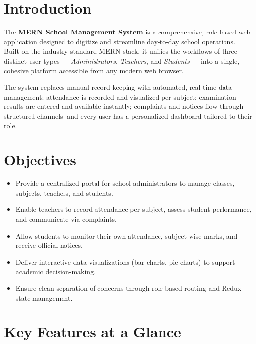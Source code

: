 \documentclass[12pt,a4paper]{report}
\begin{document}
\section{Introduction}

The \textbf{MERN School Management System} is a comprehensive, role-based web application designed to digitize and streamline day-to-day school operations. Built on the industry-standard MERN stack, it unifies the workflows of three distinct user types --- \textit{Administrators}, \textit{Teachers}, and \textit{Students} --- into a single, cohesive platform accessible from any modern web browser.

The system replaces manual record-keeping with automated, real-time data management: attendance is recorded and visualized per-subject; examination results are entered and available instantly; complaints and notices flow through structured channels; and every user has a personalized dashboard tailored to their role.

\section{Objectives}

\begin{itemize}[leftmargin=2em]
  \item Provide a centralized portal for school administrators to manage classes, subjects, teachers, and students.
  \item Enable teachers to record attendance per subject, assess student performance, and communicate via complaints.
  \item Allow students to monitor their own attendance, subject-wise marks, and receive official notices.
  \item Deliver interactive data visualizations (bar charts, pie charts) to support academic decision-making.
  \item Ensure clean separation of concerns through role-based routing and Redux state management.
\end{itemize}

\section{Key Features at a Glance}
\end{document}
